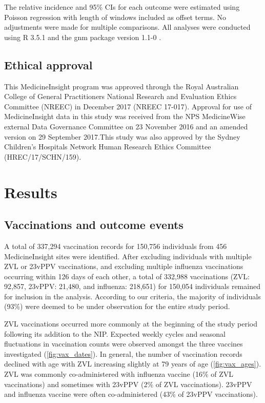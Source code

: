 \documentclass[review, endfloat]{elsarticle}
\begin{document}
The relative incidence and 95\% CIs for each outcome were estimated using Poisson regression with length of windows included as offset terms. No adjustments were made for multiple comparisons. All analyses were conducted using R 3.5.1 \citep{rmanual} and the gnm package version 1.1-0 \citep{rgnm}.

\subsection{Ethical approval}

This MedicineInsight program was approved through the Royal Australian College of General Practitioners National Research and Evaluation Ethics Committee (NREEC) in December 2017 (NREEC 17-017). Approval for use of MedicineInsight data in this study was received from the NPS MedicineWise external Data Governance Committee on 23 November 2016 and an amended version on 29 September 2017.This study was also approved by the Sydney Children’s Hospitals Network Human Research Ethics Committee (HREC/17/SCHN/159). 

\section{Results}

\subsection{Vaccinations and outcome events}

A total of 337,294 vaccination records for 150,756 individuals from 456 MedicineInsight sites were identified. After excluding individuals with multiple ZVL or 23vPPV vaccinations, and excluding multiple influenza vaccinations occurring within 126 days of each other, a total of 332,988 vaccinations (ZVL: 92,857, 23vPPV: 21,480, and influenza: 218,651) for 150,054 individuals remained for inclusion in the analysis. According to our criteria, the majority of individuals (93\%) were deemed to be under observation for the entire study period.

ZVL vaccinations occurred more commonly at the beginning of the study period following its addition to the NIP. Expected weekly cycles and seasonal fluctuations in vaccination counts were observed amongst the three vaccines investigated (\autoref{fig:vax_dates}). In general, the number of vaccination records declined with age with ZVL increasing slightly at 79 years of age (\autoref{fig:vax_ages}). ZVL was commonly co-administered with influenza vaccine (16\% of ZVL vaccinations) and sometimes with 23vPPV (2\% of ZVL vaccinations). 23vPPV and influenza vaccine were often co-administered (43\% of 23vPPV vaccinations).
\end{document}
